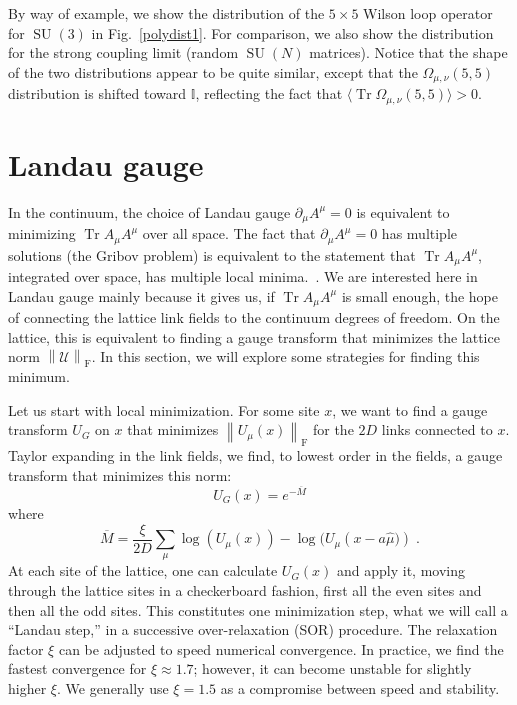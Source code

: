 \documentclass[preprint,aps,prd]{revtex4-2}
\newcommand{\be}{\begin{equation}}
\newcommand{\eq}{\end{equation}}
\newcommand{\config}{\mathcal{U}}
\newcommand{\orelax}{\xi}
\newcommand\wilson[4]{\Omega_{#1, #2}\left(#3,#4\right)}
\DeclareMathOperator{\SU}{SU}
\DeclareMathOperator{\Tr}{Tr}
\newcommand\fnorm[1]{\left\lVert #1 \right\rVert_\mathrm{F}}
\begin{document}
By way of example, we show the distribution of the
$5\times5$ Wilson loop operator for $\SU(3)$ in Fig.~\ref{polydist1}.
For comparison, we also show the distribution for
the strong coupling limit (random $\SU(N)$ matrices).
Notice that the shape of the two distributions appear to
be quite similar, except that the $\wilson{\mu}{\nu}{5}{5}$ distribution
is shifted toward $\mathbb{I}$, reflecting the fact that
$\langle\Tr \wilson{\mu}{\nu}{5}{5}\rangle >0$.


\section{Landau gauge}

In the continuum, the choice of Landau gauge $\partial_\mu A^\mu = 0$
is equivalent to minimizing $\Tr A_\mu A^\mu$ over all space.  The fact that
$\partial_\mu A^\mu = 0$ has multiple solutions (the Gribov problem) is
equivalent to the statement that $\Tr A_\mu A^\mu$, integrated over space,
has multiple local minima.~\cite{maas_more_2009}.
We are interested here in Landau gauge mainly
because it gives us, if $\Tr A_\mu A^\mu$ is small enough, the
hope of connecting the lattice
link fields to the continuum degrees of freedom.
On the lattice, this is equivalent to finding a gauge transform
that minimizes the lattice norm $\fnorm{\config}$.  In this
section, we will explore some strategies for finding this minimum.

Let us start with local minimization.
For some site $x$, we want to find a gauge transform $U_G$ on $x$
that minimizes $\fnorm{U_\mu(x)}$ for the $2D$
links connected to $x$.  Taylor expanding in the link fields,
we find, to lowest order in the fields, a gauge transform
that minimizes this norm:
%
\be
          U_G(x) = e^{- \overline{M}}
\eq
where
\be
   \overline{M} = \frac{\orelax}{2 D} \sum_\mu \log\left(U_\mu(x)\right) -
   \log(U_\mu\left(x-a \hat{\mu})\right)  \; . \label{landau}
\eq
At each site of the lattice, one can calculate $U_G(x)$ and apply it,
moving through the lattice sites in a checkerboard fashion,
first all the even sites and then all the odd sites.
This constitutes one minimization step, what we will call
a ``Landau step,'' in a
successive over-relaxation (SOR) procedure.
The relaxation factor $\orelax$ can be adjusted to speed numerical
convergence.
In practice, we find the fastest convergence for $\orelax \approx 1.7$;
however, it can become unstable for slightly higher $\orelax$.
We generally use $\orelax=1.5$ as a compromise between speed and stability.
\end{document}
